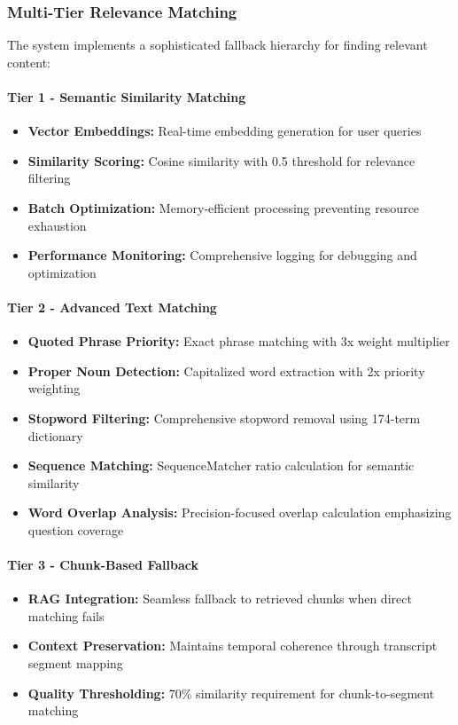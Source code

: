 \documentclass{bscs}
\begin{document}
\subsubsection{Multi-Tier Relevance Matching}

The system implements a sophisticated fallback hierarchy for finding relevant content:

\paragraph{Tier 1 - Semantic Similarity Matching}
\begin{itemize}
\item \textbf{Vector Embeddings:} Real-time embedding generation for user queries
\item \textbf{Similarity Scoring:} Cosine similarity with 0.5 threshold for relevance filtering
\item \textbf{Batch Optimization:} Memory-efficient processing preventing resource exhaustion
\item \textbf{Performance Monitoring:} Comprehensive logging for debugging and optimization
\end{itemize}

\paragraph{Tier 2 - Advanced Text Matching}
\begin{itemize}
\item \textbf{Quoted Phrase Priority:} Exact phrase matching with 3x weight multiplier
\item \textbf{Proper Noun Detection:} Capitalized word extraction with 2x priority weighting
\item \textbf{Stopword Filtering:} Comprehensive stopword removal using 174-term dictionary
\item \textbf{Sequence Matching:} SequenceMatcher ratio calculation for semantic similarity
\item \textbf{Word Overlap Analysis:} Precision-focused overlap calculation emphasizing question coverage
\end{itemize}

\paragraph{Tier 3 - Chunk-Based Fallback}
\begin{itemize}
\item \textbf{RAG Integration:} Seamless fallback to retrieved chunks when direct matching fails
\item \textbf{Context Preservation:} Maintains temporal coherence through transcript segment mapping
\item \textbf{Quality Thresholding:} 70\% similarity requirement for chunk-to-segment matching
\end{itemize}
\end{document}
